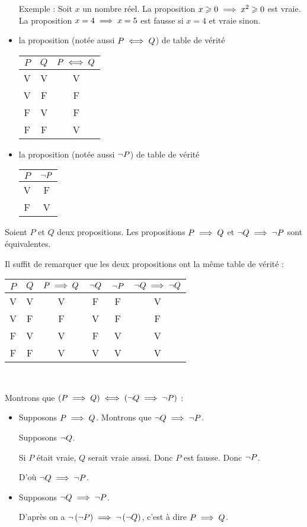\begin{defi}
\begin{itemize}
Exemple : Soit \(x\) un nombre réel. La proposition \(x\geqslant0\implies x^2\geqslant0\) est vraie. La proposition \(x=4\implies x=5\) est fausse si \(x=4\) et vraie sinon.

\item la proposition  (notée aussi \(P\iff Q\)) de table de vérité \begin{tabular}{c|c||c}
\(P\) & \(Q\) & \(P\iff Q\) \\
\hline
V & V & V \\
V & F & F \\
F & V & F \\
F & F & V
\end{tabular}

\item la proposition  (notée aussi \(\lnot P\)) de table de vérité \begin{tabular}{c||c}
\(P\) & \(\lnot P\) \\
\hline
V & F \\
F & V
\end{tabular}
\end{itemize}
\end{defi}

\begin{rem}[Contraposition]
Soient \(P\) et \(Q\) deux propositions. Les propositions \(P\implies Q\) et \(\lnot Q\implies\lnot P\) sont équivalentes.
\end{rem}

\begin{dem}[Méthode 1]
Il suffit de remarquer que les deux propositions ont la même table de vérité :

\begin{tabular}{c|c||c||c|c||c}
\(P\) & \(Q\) & \(P\implies Q\) & \(\lnot Q\) & \(\lnot P\) & \(\lnot Q\implies\lnot Q\) \\
\hline
V & V & V & F & F & V \\
V & F & F & V & F & F \\
F & V & V & F & V & V \\
F & F & V & V & V & V
\end{tabular}

~
\end{dem}

\begin{dem}[Méthode 2]
Montrons que \(\left(P\implies Q\right)\iff\left(\lnot Q\implies\lnot P\right)\) :
\begin{itemize}
\item[\impdir] Supposons \(P\implies Q\). Montrons que \(\lnot Q\implies\lnot P\).

Supposons \(\lnot Q\).

Si \(P\) était vraie, \(Q\) serait vraie aussi. Donc \(P\) est fausse. Donc \(\lnot P\).

D'où \(\lnot Q\implies\lnot P\).

\item[\imprec] Supposons \(\lnot Q\implies\lnot P\).

D'après \impdir on a \(\lnot\left(\lnot P\right)\implies\lnot\left(\lnot Q\right)\), c'est à dire \(P\implies Q\).
\end{itemize}
\end{dem}

